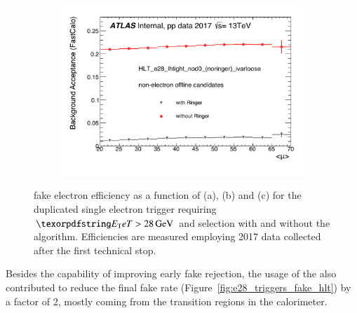 \begin{figure}[h!tb]
\begin{center}
\begin{subfigure}[c]{.59\textwidth}
  \caption{}
  \end{subfigure}\\
  \begin{subfigure}[c]{.59\textwidth}
  \centering
  \includegraphics[width=\textwidth]{sections/04_operation/figures/efficiencies/eff_EGAM7_e28_ringer_and_noringer_2017_after_ts1_L2Calo_mu.pdf}
  \caption{}
  \end{subfigure}
  \caption{\label{fig:e28_triggers_fake} \fastcalo %
  fake electron efficiency as a function of \et (a), \eta (b) and \avgmu (c) for the
  duplicated single electron trigger requiring $\et > \SI{28}{\GeV}$ and \tight
  selection with and without the \rnn{} algorithm. Efficiencies are measured
  employing 2017 data collected after the first technical stop.}%
  
  \end{center}
\end{figure}



Besides the capability of improving early fake rejection, the usage of the
\rnn{} also contributed to reduce the final fake rate
(Figure~\ref{fig:e28_triggers_fake_hlt}) by a factor of 2, mostly coming from
the transition regions in the calorimeter.

